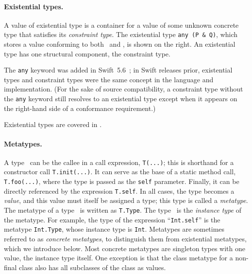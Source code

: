\documentclass[../generics]{subfiles}
\begin{document}
\paragraph{Existential types.}
A value of existential type is a container for a value of some unknown concrete type that satisfies its \emph{constraint type}. The existential type \verb|any (P & Q)|, which stores a value conforming to both \tP\ and \tQ, is shown on the right. An existential type has one structural component, the constraint type.

The \texttt{any} keyword was added in Swift~5.6~\cite{se0335}; in Swift releases prior, existential types and constraint types were the same concept in the language and implementation. (For the sake of source compatibility, a constraint type without the \texttt{any} keyword still resolves to an existential type except when it appears on the right-hand side of a conformance requirement.)

Existential types are covered in .

\begin{figure}
\end{figure}

\paragraph{Metatypes.} A type \tT\ can be the callee in a call expression, \texttt{T(...)}; this is shorthand for a constructor call \texttt{T.init(...)}. It can serve as the base of a static method call, \texttt{T.foo(...)}, where the type is passed as the \texttt{self} parameter. Finally, it can be directly referenced by the expression \texttt{T.self}. In all cases, the type becomes a \emph{value}, and this value must itself be assigned a type; this type is called a \emph{metatype}. The metatype of a type \tT\ is written as \texttt{T.Type}. The type \tT\ is the \emph{instance type} of the metatype. For example, the type of the expression ``\verb|Int.self|'' is the metatype \texttt{Int.Type}, whose instance type is \verb|Int|. Metatypes are sometimes referred to as \emph{concrete metatypes}, to distinguish them from existential metatypes, which we introduce below. Most concrete metatypes are singleton types with one value, the instance type itself. One exception is that the class metatype for a non-final class also has all subclasses of the class as values.
\end{document}
